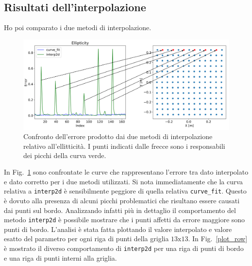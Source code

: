 \documentclass[12pt,a4paper,final]{book}
\begin{document}
\subsection{Risultati dell'interpolazione}\label{risultati_interpolazione}
Ho poi comparato i due metodi di interpolazione.
\begin{figure}[!ht]
	\centering
	\includegraphics[width=\linewidth]{../figures/punti_prob.png}
	\caption{Confronto dell'errore prodotto dai due metodi di interpolazione relativo all'ellitticità. I punti indicati dalle frecce sono i responsabili dei picchi della curva verde.}
	\label{err_int}
\end{figure}
\newline
In Fig.~\ref{err_int} sono confrontate le curve che rappresentano l'errore tra dato interpolato e dato corretto per i due metodi utilizzati. Si nota immediatamente che la curva relativa a \texttt{interp2d} è sensibilmente peggiore di quella relativa \texttt{curve\_fit}. Questo è dovuto alla presenza di alcuni picchi problematici che risultano essere causati dai punti sul bordo.
Analizzando infatti più in dettaglio il comportamento del metodo \texttt{interp2d} è possibile mostrare che i punti affetti da errore maggiore sono punti di bordo. L'analisi è stata fatta plottando il valore interpolato e valore esatto del parametro per ogni riga di punti della griglia $13\text{x}13$.
In Fig.~\ref{plot_row} è mostrato il diverso comportamento di \texttt{interp2d} per una riga di punti di bordo e una riga di punti interni alla griglia.
\end{document}
